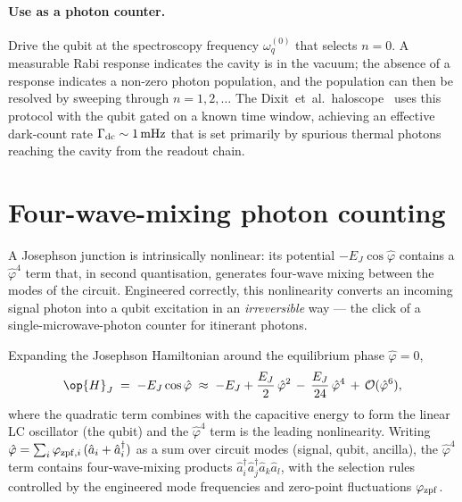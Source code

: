 \paragraph{Use as a photon counter.}
Drive the qubit at the spectroscopy frequency $\omega_q^{(0)}$
that selects $n=0$. A measurable Rabi response indicates the cavity
is in the vacuum; the absence of a response indicates a non-zero
photon population, and the population can then be resolved by
sweeping through $n=1,2,\dots$ The Dixit~et~al.\
haloscope~\cite{dixit2021} uses this protocol with the qubit gated
on a known time window, achieving an effective dark-count rate
$\Gamma_{\rm dc}\sim 1\,\text{mHz}$ that is set primarily by
spurious thermal photons reaching the cavity from the readout chain.

\section{Four-wave-mixing photon counting}
\label{sec:fwm-photon-counting}

\begin{phenomenon}
A Josephson junction is intrinsically nonlinear: its potential
$-E_J\cos\hat\varphi$ contains a $\hat\varphi^4$ term that, in
second quantisation, generates four-wave mixing between the modes
of the circuit. Engineered correctly, this nonlinearity converts
an incoming signal photon into a qubit excitation in an
\emph{irreversible} way --- the click of a single-microwave-photon
counter for itinerant photons.
\end{phenomenon}

\begin{statement}
\label{stmt:josephson-fwm}
Expanding the Josephson Hamiltonian around the equilibrium phase
$\hat\varphi=0$,
\begin{equation}
\label{eq:josephson-expansion}
\op{H}_J \;=\; -E_J\cos\hat\varphi
\;\approx\; -E_J + \frac{E_J}{2}\,\hat\varphi^2
\,-\, \frac{E_J}{24}\,\hat\varphi^4
\,+\, \mathcal O(\hat\varphi^6),
\end{equation}
where the quadratic term combines with the capacitive energy to
form the linear LC oscillator (the qubit) and the $\hat\varphi^4$
term is the leading nonlinearity. Writing
$\hat\varphi=\sum_i \varphi_{{\rm zpf},i}\,(\hat a_i+\hat a_i^\dagger)$
as a sum over circuit modes (signal, qubit, ancilla), the
$\hat\varphi^4$ term contains four-wave-mixing products
$\hat a_i^\dagger \hat a_j^\dagger \hat a_k \hat a_l$, with the
selection rules controlled by the engineered mode frequencies
and zero-point fluctuations $\varphi_{{\rm zpf}}$.
\end{statement}

